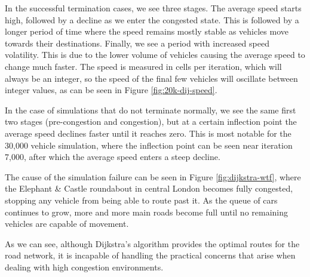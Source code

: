 \documentclass[ %
                    author={Alexander Hill},
                supervisor={Dr. Benjamin Sach},
                    degree={MEng},
                     title={MARMOSET},
                  subtitle={Multi-Agent Route Management using Online Simulation for Efficient Transportation},
                      type={research},
                      year={2016} ]{dissertation}
\begin{document}
In the successful termination cases, we see three stages. The average speed
starts high, followed by a decline as we enter the congested state. This is
followed by a longer period of time where the speed remains mostly stable as
vehicles move towards their destinations. Finally, we see a period with
increased speed volatility. This is due to the lower volume of vehicles causing
the average speed to change much faster. The speed is measured in cells per
iteration, which will always be an integer, so the speed of the final few
vehicles will oscillate between integer values, as can be seen in Figure
\ref{fig:20k-dij-speed}.

In the case of simulations that do not terminate normally, we see the same first
two stages (pre-congestion and congestion), but at a certain inflection point
the average speed declines faster until it reaches zero. This is most notable
for the 30,000 vehicle simulation, where the inflection point can be seen near
iteration 7,000, after which the average speed enters a steep decline.

The cause of the simulation failure can be seen in Figure
\ref{fig:dijkstra-wtf}, where the Elephant \& Castle roundabout in central
London becomes fully congested, stopping any vehicle from being able to route
past it. As the queue of cars continues to grow, more and more main roads become
full until no remaining vehicles are capable of movement.

As we can see, although Dijkstra's algorithm provides the optimal routes for the
road network, it is incapable of handling the practical concerns that arise when
dealing with high congestion environments.
\end{document}
